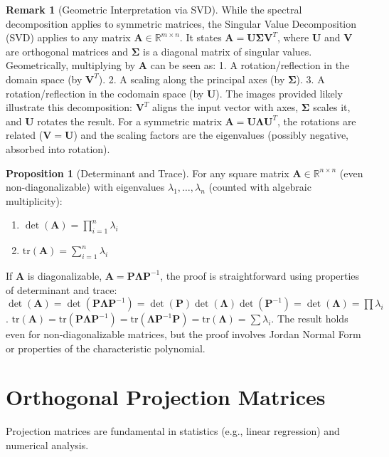 \documentclass[12pt, letterpaper]{article}
\theoremstyle{definition}
\newtheorem{proposition}{Proposition}[section]
\newtheorem{remark}{Remark}[section]
\newcommand{\R}{\mathbb{R}}
\newcommand{\mat}[1]{\mathbf{#1}} %
\newcommand{\tr}{\text{tr}}
\begin{document}
\begin{remark}[Geometric Interpretation via SVD]
While the spectral decomposition applies to symmetric matrices, the Singular Value Decomposition (SVD) applies to any matrix $\mat{A} \in \R^{m \times n}$. It states $\mat{A} = \mat{U} \mat{\Sigma} \mat{V}^T$, where $\mat{U}$ and $\mat{V}$ are orthogonal matrices and $\mat{\Sigma}$ is a diagonal matrix of singular values.
Geometrically, multiplying by $\mat{A}$ can be seen as:
1.  A rotation/reflection in the domain space (by $\mat{V}^T$).
2.  A scaling along the principal axes (by $\mat{\Sigma}$).
3.  A rotation/reflection in the codomain space (by $\mat{U}$).
The images provided likely illustrate this decomposition: $\mat{V}^T$ aligns the input vector with axes, $\mat{\Sigma}$ scales it, and $\mat{U}$ rotates the result. For a symmetric matrix $\mat{A} = \mat{U} \mat{\Lambda} \mat{U}^T$, the rotations are related ($\mat{V} = \mat{U}$) and the scaling factors are the eigenvalues (possibly negative, absorbed into rotation).
\end{remark}

\begin{proposition}[Determinant and Trace]
For any square matrix $\mat{A} \in \R^{n \times n}$ (even non-diagonalizable) with eigenvalues $\lambda_1, \dots, \lambda_n$ (counted with algebraic multiplicity):
\begin{enumerate}
    \item $\det(\mat{A}) = \prod_{i=1}^n \lambda_i$
    \item $\tr(\mat{A}) = \sum_{i=1}^n \lambda_i$
\end{enumerate}
If $\mat{A}$ is diagonalizable, $\mat{A} = \mat{P} \mat{\Lambda} \mat{P}^{-1}$, the proof is straightforward using properties of determinant and trace:
$\det(\mat{A}) = \det(\mat{P} \mat{\Lambda} \mat{P}^{-1}) = \det(\mat{P}) \det(\mat{\Lambda}) \det(\mat{P}^{-1}) = \det(\mat{\Lambda}) = \prod \lambda_i$.
$\tr(\mat{A}) = \tr(\mat{P} \mat{\Lambda} \mat{P}^{-1}) = \tr(\mat{\Lambda} \mat{P}^{-1} \mat{P}) = \tr(\mat{\Lambda}) = \sum \lambda_i$.
The result holds even for non-diagonalizable matrices, but the proof involves Jordan Normal Form or properties of the characteristic polynomial.
\end{proposition}

\section{Orthogonal Projection Matrices}

Projection matrices are fundamental in statistics (e.g., linear regression) and numerical analysis.
\end{document}
